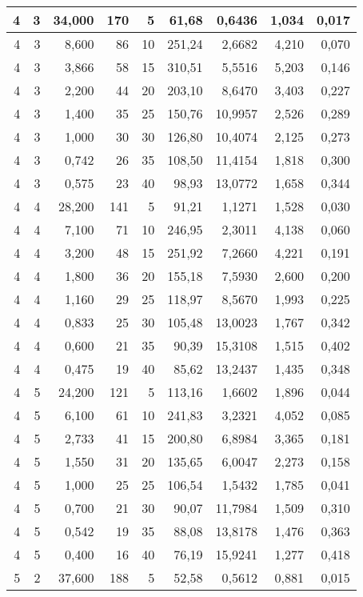 \begin{tabular}{rrrrrrrrr}
4 & 3 & 34,000 & 170 & 5 & 61,68 & 0,6436 & 1,034 & 0,017 \\ \hline
4 & 3 & 8,600 & 86 & 10 & 251,24 & 2,6682 & 4,210 & 0,070 \\ \hline
4 & 3 & 3,866 & 58 & 15 & 310,51 & 5,5516 & 5,203 & 0,146 \\ \hline
4 & 3 & 2,200 & 44 & 20 & 203,10 & 8,6470 & 3,403 & 0,227 \\ \hline
4 & 3 & 1,400 & 35 & 25 & 150,76 & 10,9957 & 2,526 & 0,289 \\ \hline
4 & 3 & 1,000 & 30 & 30 & 126,80 & 10,4074 & 2,125 & 0,273 \\ \hline
4 & 3 & 0,742 & 26 & 35 & 108,50 & 11,4154 & 1,818 & 0,300 \\ \hline
4 & 3 & 0,575 & 23 & 40 & 98,93 & 13,0772 & 1,658 & 0,344 \\ \hline
4 & 4 & 28,200 & 141 & 5 & 91,21 & 1,1271 & 1,528 & 0,030 \\ \hline
4 & 4 & 7,100 & 71 & 10 & 246,95 & 2,3011 & 4,138 & 0,060 \\ \hline
4 & 4 & 3,200 & 48 & 15 & 251,92 & 7,2660 & 4,221 & 0,191 \\ \hline
4 & 4 & 1,800 & 36 & 20 & 155,18 & 7,5930 & 2,600 & 0,200 \\ \hline
4 & 4 & 1,160 & 29 & 25 & 118,97 & 8,5670 & 1,993 & 0,225 \\ \hline
4 & 4 & 0,833 & 25 & 30 & 105,48 & 13,0023 & 1,767 & 0,342 \\ \hline
4 & 4 & 0,600 & 21 & 35 & 90,39 & 15,3108 & 1,515 & 0,402 \\ \hline
4 & 4 & 0,475 & 19 & 40 & 85,62 & 13,2437 & 1,435 & 0,348 \\ \hline
4 & 5 & 24,200 & 121 & 5 & 113,16 & 1,6602 & 1,896 & 0,044 \\ \hline
4 & 5 & 6,100 & 61 & 10 & 241,83 & 3,2321 & 4,052 & 0,085 \\ \hline
4 & 5 & 2,733 & 41 & 15 & 200,80 & 6,8984 & 3,365 & 0,181 \\ \hline
4 & 5 & 1,550 & 31 & 20 & 135,65 & 6,0047 & 2,273 & 0,158 \\ \hline
4 & 5 & 1,000 & 25 & 25 & 106,54 & 1,5432 & 1,785 & 0,041 \\ \hline
4 & 5 & 0,700 & 21 & 30 & 90,07 & 11,7984 & 1,509 & 0,310 \\ \hline
4 & 5 & 0,542 & 19 & 35 & 88,08 & 13,8178 & 1,476 & 0,363 \\ \hline
4 & 5 & 0,400 & 16 & 40 & 76,19 & 15,9241 & 1,277 & 0,418 \\ \hline
5 & 2 & 37,600 & 188 & 5 & 52,58 & 0,5612 & 0,881 & 0,015 \\ \hline

\end{tabular}

